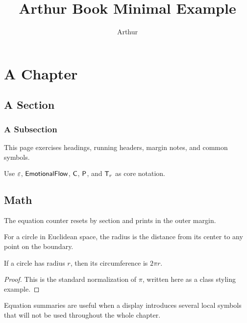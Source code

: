 \documentclass[wide-notes]{arthur-book}
\title{Arthur Book Minimal Example}
\author{Arthur}
\begin{document}
\maketitle
\tableofcontents

\chapter{A Chapter}
\section{A Section}
\subsection{A Subsection}

This page exercises headings, running headers, margin notes, and common symbols.

\begin{arthurnotation}
Use \(\varepsilon\), \(\mathsf{EmotionalFlow}\), \(\mathsf{C}\), \(\mathsf{P}\), and \(\mathsf{T}_r\) as core notation.
\end{arthurnotation}

\notationbox

\section{Math}

The equation counter resets by section and prints in the outer margin.

\begin{definition}[Radius]
For a circle in Euclidean space, the radius is the distance from its center to
any point on the boundary.
\end{definition}

\begin{theorem}
If a circle has radius \(r\), then its circumference is \(2\pi r\).
\end{theorem}

\begin{proof}
This is the standard normalization of \(\pi\), written here as a class styling
example.
\end{proof}

\begin{localnotation}
\end{localnotation}

\begin{infobox}[title=Reading note]
Equation summaries are useful when a display introduces several local symbols
that will not be used throughout the whole chapter.
\end{infobox}
\end{document}
